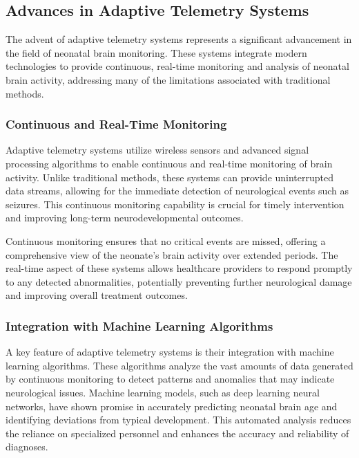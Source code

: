 \documentclass[12pt,journal,compsoc]{IEEEtran}
\begin{document}
\subsection{Advances in Adaptive Telemetry Systems}

The advent of adaptive telemetry systems represents a significant advancement in the field of neonatal brain monitoring. These systems integrate modern technologies to provide continuous, real-time monitoring and analysis of neonatal brain activity, addressing many of the limitations associated with traditional methods.

\subsubsection{Continuous and Real-Time Monitoring}

Adaptive telemetry systems utilize wireless sensors and advanced signal processing algorithms to enable continuous and real-time monitoring of brain activity. Unlike traditional methods, these systems can provide uninterrupted data streams, allowing for the immediate detection of neurological events such as seizures. This continuous monitoring capability is crucial for timely intervention and improving long-term neurodevelopmental outcomes.

Continuous monitoring ensures that no critical events are missed, offering a comprehensive view of the neonate's brain activity over extended periods. The real-time aspect of these systems allows healthcare providers to respond promptly to any detected abnormalities, potentially preventing further neurological damage and improving overall treatment outcomes.

\subsubsection{Integration with Machine Learning Algorithms}

A key feature of adaptive telemetry systems is their integration with machine learning algorithms. These algorithms analyze the vast amounts of data generated by continuous monitoring to detect patterns and anomalies that may indicate neurological issues. Machine learning models, such as deep learning neural networks, have shown promise in accurately predicting neonatal brain age and identifying deviations from typical development. This automated analysis reduces the reliance on specialized personnel and enhances the accuracy and reliability of diagnoses.
\end{document}
